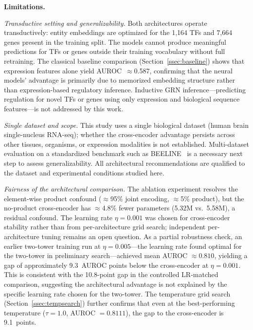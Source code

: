 \documentclass[journal]{IEEEtran}
\begin{document}
\textbf{Limitations.}

\emph{Transductive setting and generalizability.}
Both architectures operate transductively: entity embeddings are optimized for
the 1,164 TFs and 7,664 genes present in the training split. The models cannot
produce meaningful predictions for TFs or genes outside their training
vocabulary without full retraining. The classical baseline comparison
(Section~\ref{ssec:baseline}) shows that expression features alone yield
AUROC~$\approx$0.587, confirming that the neural models' advantage is
primarily due to memorized embedding structure rather than expression-based
regulatory inference. Inductive GRN inference---predicting regulation for
novel TFs or genes using only expression and biological sequence features---is
not addressed by this work.

\emph{Single dataset and scope.}
This study uses a single biological dataset (human brain single-nucleus
RNA-seq); whether the cross-encoder advantage persists across other tissues,
organisms, or expression modalities is not established. Multi-dataset
evaluation on a standardized benchmark such as BEELINE~\cite{pratapa2020}
is a necessary next step to assess generalizability. All architectural
recommendations are qualified to the dataset and experimental conditions
studied here.

\emph{Fairness of the architectural comparison.}
The ablation experiment resolves the element-wise product confound
($\approx$95\% joint encoding, $\approx$5\% product), but the no-product
cross-encoder has $\approx$4.8\% fewer parameters (5.32M vs.\ 5.58M), a
residual confound. The learning rate $\eta = 0.001$ was chosen for
cross-encoder stability rather than from per-architecture grid search;
independent per-architecture tuning remains an open question.
As a partial robustness check, an earlier two-tower training run at
$\eta = 0.005$---the learning rate found optimal for the two-tower in
preliminary search---achieved mean AUROC $\approx 0.810$, yielding a gap
of approximately 9.3~AUROC points below the cross-encoder at
$\eta = 0.001$. This is consistent with the 10.8-point gap in the
controlled LR-matched comparison, suggesting the architectural advantage
is not explained by the specific learning rate chosen for the two-tower.
The temperature grid search (Section~\ref{ssec:tempsearch}) further
confirms that even at the best-performing temperature ($\tau=1.0$, AUROC
$=0.8111$), the gap to the cross-encoder is 9.1~points.
\end{document}
